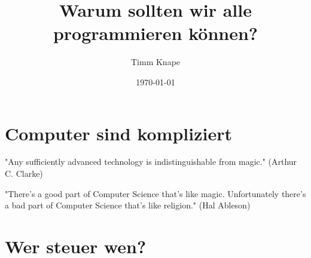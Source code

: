 \documentclass[a5paper,ngerman]{article}
\title{\color{emph}Warum sollten wir alle programmieren können?}
\author{Timm Knape}
\date{\today}
\begin{document}
\pagecolor{background}
\color{normal}
\allsectionsfont{\color{emph}\mdseries}
\pagestyle{plain}
\maketitle
\thispagestyle{fancy}
\begin{multicols}{2}

\end{multicols}
\section{Computer sind kompliziert}
\begin{multicols}{2}

"Any sufficiently advanced technology is indistinguishable from magic."
(Arthur C. Clarke)

"There's a good part of Computer Science that's like magic.
Unfortunately there's a bad part of Computer Science that's like
religion." (Hal Ableson)

\end{multicols}
\section{Wer steuer wen?}
\begin{multicols}{2}

\end{multicols}
\end{document}
